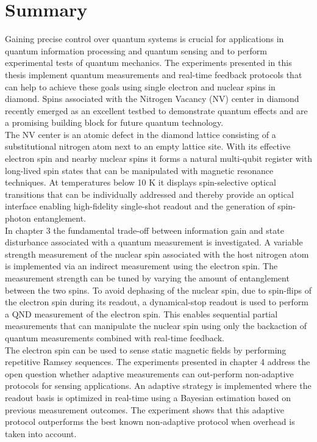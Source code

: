 \chapter{Summary}

Gaining precise control over quantum systems is crucial for applications in quantum information processing and quantum sensing and to perform experimental tests of quantum mechanics. The experiments presented in this thesis implement quantum measurements and real-time feedback protocols that can help to achieve these goals using single electron and nuclear spins in diamond. Spins associated with the Nitrogen Vacancy (NV) center in diamond recently emerged as an excellent testbed to demonstrate quantum effects and are a promising building block for future quantum technology.\\

The NV center is an atomic defect in the diamond lattice consisting of a substitutional nitrogen atom next to an empty lattice site. With its effective electron spin and nearby nuclear spins it forms a natural multi-qubit register with long-lived spin states that can be manipulated with magnetic resonance techniques. At temperatures below 10 K it displays spin-selective optical transitions that can be individually addressed and thereby provide an optical interface enabling high-fidelity single-shot readout and the generation of spin-photon entanglement.\\

In chapter 3 the fundamental trade-off between information gain and state disturbance associated with a quantum measurement is investigated. A variable strength measurement of the nuclear spin associated with the host nitrogen atom is implemented via an indirect measurement using the electron spin. The measurement strength can be tuned by varying the amount of entanglement between the two spins. To avoid dephasing of the nuclear spin, due to spin-flips of the electron spin during its readout, a dynamical-stop readout is used to perform a QND measurement of the electron spin. This enables sequential partial measurements that can manipulate the nuclear spin using only the backaction of quantum measurements combined with real-time feedback. \\

The electron spin can be used to sense static magnetic fields by performing repetitive Ramsey sequences. The experiments presented in chapter 4 address the open question whether adaptive measurements can out-perform non-adaptive protocols for sensing applications. An adaptive strategy is implemented where the readout basis is optimized in real-time using a Bayesian estimation based on previous measurement outcomes. The experiment shows that this adaptive protocol outperforms the best known non-adaptive protocol when overhead is taken into account.\\

